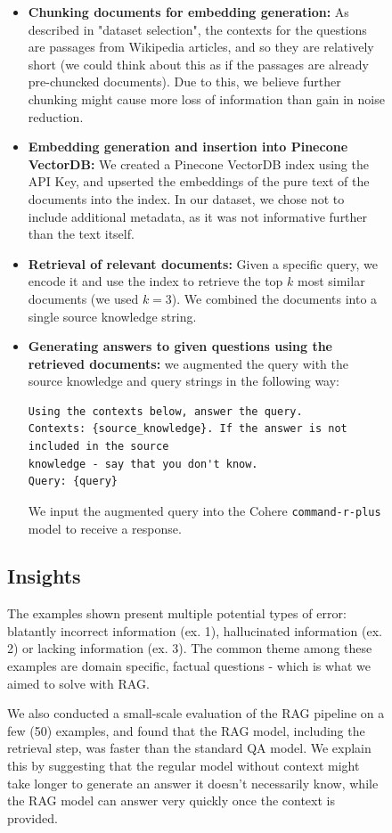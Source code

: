 \documentclass[12pt]{article}
\begin{document}
\begin{figure}[H]
\begin{itemize}
    \item \textbf{Chunking documents for embedding generation:} As described in "dataset selection", the contexts for the questions are passages from Wikipedia articles, and so they are relatively short (we could think about this as if the passages are already pre-chuncked documents).
    Due to this, we believe further chunking might cause more loss of information than gain in noise reduction.
    
    \item \textbf{Embedding generation and insertion into Pinecone VectorDB:} We created a Pinecone VectorDB index using the API Key, and upserted the embeddings of the pure text of the documents into the index. 
    In our dataset, we chose not to include additional metadata, as it was not informative further than the text itself.
    
    \item \textbf{Retrieval of relevant documents:} Given a specific query, we encode it and use the index to retrieve the top $k$ most similar documents (we used $k=3$). We combined the documents into a single source knowledge string.

    \item \textbf{Generating answers to given questions using the retrieved documents:} we augmented the query with the source knowledge and query strings in the following way:

\begin{verbatim}
Using the contexts below, answer the query.
Contexts: {source_knowledge}. If the answer is not included in the source 
knowledge - say that you don't know.
Query: {query}
\end{verbatim}

    We input the augmented query into the Cohere \texttt{command-r-plus} model to receive a response.

\end{itemize}

\subsection{Insights}


The examples shown present multiple potential types of error: blatantly incorrect information (ex. 1), hallucinated information (ex. 2) or lacking information (ex. 3).
The common theme among these examples are domain specific, factual questions - which is what we aimed to solve with RAG.

We also conducted a small-scale evaluation of the RAG pipeline on a few (50) examples, and found that the RAG model, including the retrieval step, was faster than the standard QA model. 
We explain this by suggesting that the regular model without context might take longer to generate an answer it doesn't necessarily know, while the RAG model can answer very quickly once the context is provided.


\end{figure}
\end{document}
